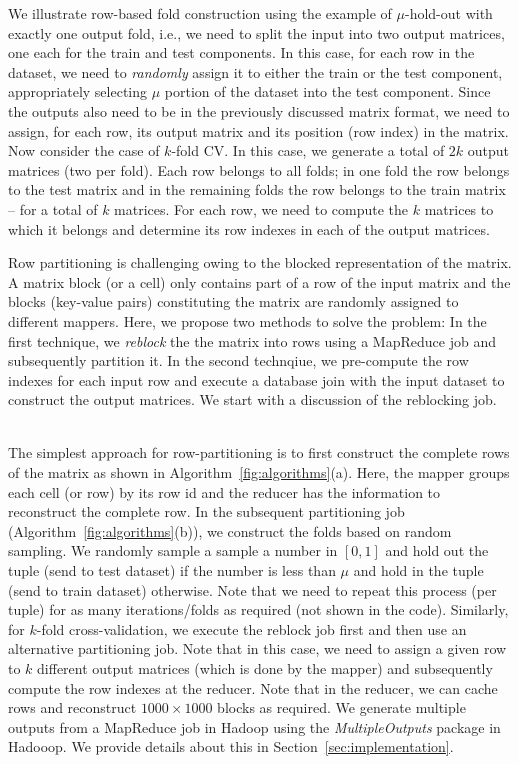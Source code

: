 \documentclass{vldb}
\newcommand{\topic}[1]{\par \smallskip \smallskip \noindent{\bf \uline{#1}}}
\begin{document}
We illustrate row-based fold construction using the example of $\mu$-hold-out
with exactly one output fold, i.e., we need to split the input into two output
matrices, one each for the train and test components.
In this case, for each row in the dataset, we need to {\em randomly} assign it to
either the train or the test component, appropriately selecting $\mu$ portion of
the dataset into the test component. Since the outputs also need to be in the
previously discussed matrix format, we need to assign, for each row, its output
matrix and its position (row index) in the matrix.
Now consider the case of
$k$-fold CV. In this case, we generate a total of $2k$ output matrices (two per
fold). Each row belongs to all folds; in one fold the row belongs to the test
matrix and in the remaining folds the row belongs to the train matrix -- for a
total of $k$ matrices. For each row, we need to compute the $k$ matrices to
which it belongs and determine its row indexes in each of the output matrices. 

Row partitioning is challenging owing to the blocked representation of the matrix. A
matrix block (or a cell) only contains part of a row of the input matrix and the
blocks (key-value pairs) constituting the matrix are randomly assigned to
different mappers. Here, we propose two methods to solve the problem: In the
first technique, we {\em reblock} the the matrix into rows using a MapReduce job
and subsequently partition it. In the second technqiue, we pre-compute the row
indexes for each input row and execute a database join with the input dataset to
construct the output matrices. We start with a discussion of the reblocking job.

\topic{Using Reblock}\\
\noindent The simplest approach for row-partitioning is to first construct the 
complete rows of the matrix as shown in Algorithm~\ref{fig:algorithms}(a). Here,
the mapper groups each cell (or row) by its row id and the reducer has the
information to reconstruct the complete row. In the subsequent partitioning job
(Algorithm~\ref{fig:algorithms}(b)), we construct the folds based on random sampling. 
We randomly sample a sample a number in $[0,1]$
and hold out the tuple (send to test dataset) if the number is less than
$\mu$ and hold in the tuple (send to train dataset) otherwise.
Note that we need to repeat this process (per tuple) for as many
iterations/folds as required (not shown in the code).
Similarly, for $k$-fold cross-validation, we execute the reblock job first and
then use an alternative partitioning job. Note that in this case, we need to
assign a given row to $k$ different output matrices (which is done by the
mapper) and subsequently compute the row indexes at the reducer. Note that in
the reducer, we can cache rows and reconstruct $1000\times 1000$ blocks as
required.
We generate multiple outputs from a MapReduce job in Hadoop using the {\em
MultipleOutputs} package in Hadooop. We provide details about this in
Section~\ref{sec:implementation}.
\end{document}
